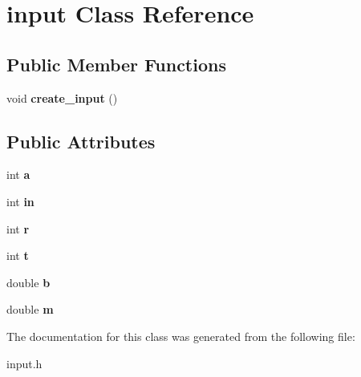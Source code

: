 \hypertarget{classinput}{}\section{input Class Reference}
\label{classinput}
\subsection*{Public Member Functions}
\begin{DoxyCompactItemize}
\item 
void {\bfseries create\+\_\+input} ()\hypertarget{classinput_aa03c9c23c436bdf93aa620ea800fe4d7}{}\label{classinput_aa03c9c23c436bdf93aa620ea800fe4d7}

\end{DoxyCompactItemize}
\subsection*{Public Attributes}
\begin{DoxyCompactItemize}
\item 
int {\bfseries a}\hypertarget{classinput_af82d0b7b6f40802d0a66cf86159588f8}{}\label{classinput_af82d0b7b6f40802d0a66cf86159588f8}

\item 
int {\bfseries in}\hypertarget{classinput_ab20692a2f5e7cb9ef6d0c1e5ad5dd80b}{}\label{classinput_ab20692a2f5e7cb9ef6d0c1e5ad5dd80b}

\item 
int {\bfseries r}\hypertarget{classinput_a840699a045cba063dec2263fb0c53283}{}\label{classinput_a840699a045cba063dec2263fb0c53283}

\item 
int {\bfseries t}\hypertarget{classinput_a1e3ee5beac6d8f6356a7225c8066e050}{}\label{classinput_a1e3ee5beac6d8f6356a7225c8066e050}

\item 
double {\bfseries b}\hypertarget{classinput_a79e10c16e841b84aff10326f893fdc8c}{}\label{classinput_a79e10c16e841b84aff10326f893fdc8c}

\item 
double {\bfseries m}\hypertarget{classinput_a24acee350413a13a6932c42e89ec190d}{}\label{classinput_a24acee350413a13a6932c42e89ec190d}

\end{DoxyCompactItemize}


The documentation for this class was generated from the following file\+:\begin{DoxyCompactItemize}
\item 
input.\+h\end{DoxyCompactItemize}
